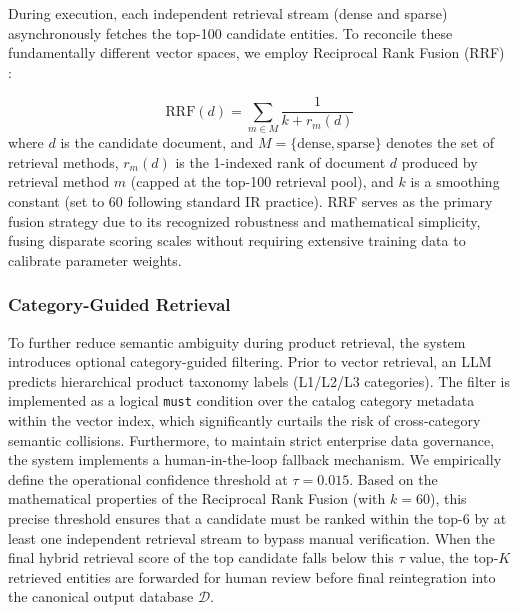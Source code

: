 During execution, each independent retrieval stream (dense and sparse) asynchronously fetches the top-100 candidate entities. To reconcile these fundamentally different vector spaces, we employ Reciprocal Rank Fusion (RRF) \parencite{cormack2009reciprocal}:

\begin{equation}
\text{RRF}(d) = \sum_{m \in M} \frac{1}{k + r_m(d)}
\end{equation}
where $d$ is the candidate document, and 
$M = \{\text{dense}, \text{sparse}\}$ denotes the set of retrieval methods, $r_m(d)$ is the 1-indexed rank of document $d$ produced by retrieval method $m$ (capped at the top-100 retrieval pool), and $k$ is a smoothing constant (set to $60$ following standard IR practice). RRF serves as the primary fusion strategy due to its recognized robustness and mathematical simplicity, fusing disparate scoring scales without requiring extensive training data to calibrate parameter weights.

\subsubsection{Category-Guided Retrieval}
To further reduce semantic ambiguity during product retrieval, the system introduces optional category-guided filtering. Prior to vector retrieval, an LLM predicts hierarchical product taxonomy labels (L1/L2/L3 categories). The filter is implemented as a logical \texttt{must} condition over the catalog category metadata within the vector index, which significantly curtails the risk of cross-category semantic collisions. Furthermore, to maintain strict enterprise data governance, the system implements a human-in-the-loop fallback mechanism. We empirically define the operational confidence threshold at $\tau = 0.015$. Based on the mathematical properties of the Reciprocal Rank Fusion (with $k=60$), this precise threshold ensures that a candidate must be ranked within the top-6 by at least one independent retrieval stream to bypass manual verification. When the final hybrid retrieval score of the top candidate falls below this $\tau$ value, the top-$K$ retrieved entities are forwarded for human review before final reintegration into the canonical output database $\mathcal{D}$.


